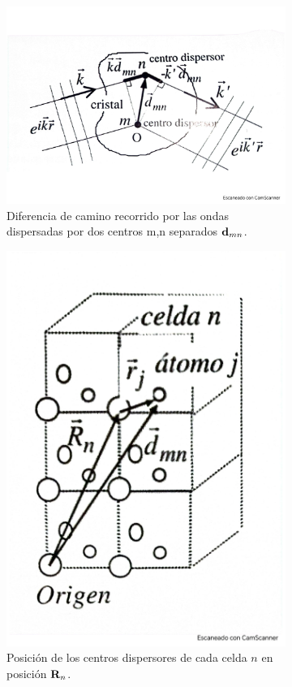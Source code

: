 \begin{figure}[h!]\centering
\begin{subfigure}{0.43\linewidth} \centering
	\includegraphics[scale=0.30]{Cuerpo/Ch_02/Fotos_libro 2.pdf}
	\caption{Diferencia de camino recorrido por las ondas dispersadas por dos centros m,n separados $\mathbf{d}_{mn}$.}
	\label{Fig:02-02}
\end{subfigure}
\begin{subfigure}{0.43\linewidth} \centering
	\includegraphics[scale=0.20]{Cuerpo/Ch_02/Fotos_libro 3.pdf}
	\caption{Posición de los centros dispersores de cada celda $n$ en posición $\mathbf{R}_n$.}
	\label{Fig:02-03}
\end{subfigure}
\caption{}
\end{figure}


